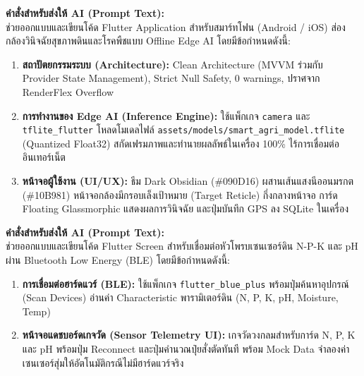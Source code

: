\begin{tcolorbox}[colback=black!92,colframe=green!60!black,arc=2mm,boxrule=0.6pt]
\color{white}\fontsize{9}{13}\selectfont
\noindent\textbf{คำสั่งสำหรับส่งให้ AI (Prompt Text):}\\[4pt]
ช่วยออกแบบและเขียนโค้ด Flutter Application สำหรับสมาร์ทโฟน (Android / iOS) ส่องกล้องวินิจฉัยสุขภาพดินและโรคพืชแบบ Offline Edge AI โดยมีข้อกำหนดดังนี้:
\begin{enumerate}[leftmargin=1.8em, itemsep=2pt]
    \item \textbf{สถาปัตยกรรมระบบ (Architecture):} Clean Architecture (MVVM ร่วมกับ Provider State Management), Strict Null Safety, 0 warnings, ปราศจาก RenderFlex Overflow
    \item \textbf{การทำงานของ Edge AI (Inference Engine):} ใช้แพ็กเกจ \texttt{camera} และ \texttt{tflite\_flutter} โหลดโมเดลไฟล์ \texttt{assets/models/smart\_agri\_model.tflite} (Quantized Float32) สกัดเฟรมภาพและทำนายผลลัพธ์ในเครื่อง 100\% ไร้การเชื่อมต่ออินเทอร์เน็ต
    \item \textbf{หน้าจอผู้ใช้งาน (UI/UX):} ธีม Dark Obsidian (\#090D16) ผสานเส้นแสงนีออนมรกต (\#10B981) หน้าจอกล้องมีกรอบเล็งเป้าหมาย (Target Reticle) กึ่งกลางหน้าจอ การ์ด Floating Glassmorphic แสดงผลการวินิจฉัย และปุ่มบันทึก GPS ลง SQLite ในเครื่อง
\end{enumerate}
\end{tcolorbox}


\begin{tcolorbox}[colback=black!92,colframe=cyan!70!black,arc=2mm,boxrule=0.6pt]
\color{white}\fontsize{9}{13}\selectfont
\noindent\textbf{คำสั่งสำหรับส่งให้ AI (Prompt Text):}\\[4pt]
ช่วยออกแบบและเขียนโค้ด Flutter Screen สำหรับเชื่อมต่อหัวโพรบเซนเซอร์ดิน N-P-K และ pH ผ่าน Bluetooth Low Energy (BLE) โดยมีข้อกำหนดดังนี้:
\begin{enumerate}[leftmargin=1.8em, itemsep=2pt]
    \item \textbf{การเชื่อมต่อฮาร์ดแวร์ (BLE):} ใช้แพ็กเกจ \texttt{flutter\_blue\_plus} พร้อมปุ่มค้นหาอุปกรณ์ (Scan Devices) อ่านค่า Characteristic พารามิเตอร์ดิน (N, P, K, pH, Moisture, Temp)
    \item \textbf{หน้าจอแดชบอร์ดเกจวัด (Sensor Telemetry UI):} เกจวัดวงกลมสำหรับการ์ด N, P, K และ pH พร้อมปุ่ม Reconnect และปุ่มคำนวณปุ๋ยสั่งตัดทันที พร้อม Mock Data จำลองค่าเซนเซอร์สุ่มให้อัตโนมัติกรณีไม่มีฮาร์ดแวร์จริง
\end{enumerate}
\end{tcolorbox}

